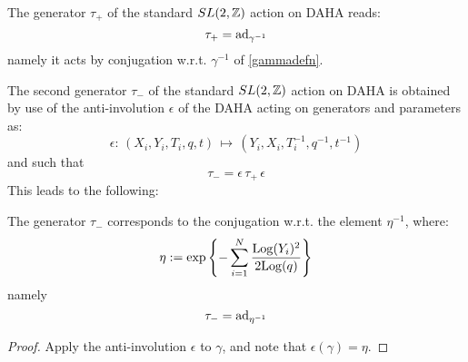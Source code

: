 \begin{lemma}\label{taupluslemma}
The generator $\tau_+$ of the standard $SL(2,{\mathbb Z})$ action on DAHA reads:
$$ \tau_+={\rm ad}_{\gamma^{-1}} $$
namely it acts by conjugation w.r.t. $\gamma^{-1}$ of \eqref{gammadefn}.
\end{lemma}

The second generator $\tau_-$ of the standard $SL(2,{\mathbb Z})$ action on DAHA is obtained by use of the
anti-involution $\epsilon$ of the DAHA acting on generators and parameters as:
$$\epsilon:\, (X_i,Y_i,T_i,q,t)\, \mapsto \, (Y_i,X_i,T_i^{-1},q^{-1},t^{-1})$$
and such that 
$$\tau_-=\epsilon \, \tau_+\, \epsilon $$
This leads to the following:

\begin{lemma}\label{taumoinslemma}
The generator $\tau_-$ corresponds to the conjugation w.r.t. the element $\eta^{-1}$, where:
\begin{equation}\label{etadefn}
\eta:=\exp\left\{ -\sum_{i=1}^{N} \frac{{\rm Log}(Y_i)^2}{2 {\rm Log}(q)}\right\} 
\end{equation}
namely
$$ \tau_-={\rm ad}_{\eta^{-1}} $$
\end{lemma}
\begin{proof}
Apply the anti-involution $\epsilon$ to $\gamma$, and note that $\epsilon(\gamma)=\eta$.
\end{proof}

